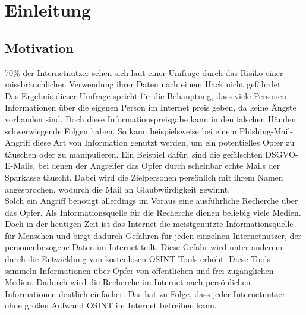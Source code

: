\chapter{Einleitung}
\label{cha:einleitung}

\section{Motivation}
70\% der Internetnutzer sehen sich laut einer Umfrage durch das Risiko einer missbräuchlichen Verwendung ihrer Daten nach einem Hack nicht gefährdet \cite{AngstDatendiebstahl}\\
Das Ergebnis dieser Umfrage spricht für die Behauptung, dass viele Personen Informationen über die eigenen Person im Internet preis geben, da keine Ängste vorhanden sind. Doch diese Informationspreisgabe kann in den falschen Händen schwerwiegende Folgen haben. So kann beispielsweise bei einem Phishing-Mail-Angriff diese Art von Information genutzt werden, um ein potentielles Opfer zu täuschen oder zu manipulieren. 
Ein Beispiel dafür, sind die gefälschten DSGVO-E-Mails, bei denen der Angreifer das Opfer durch scheinbar echte Mails der Sparkasse täuscht. Dabei wird die Zielpersonen persönlich mit ihrem Namen angesprochen, wodurch die Mail an Glaubwürdigkeit gewinnt. \cite{VerbraucherzentraleNW}
\\
Solch ein Angriff benötigt allerdings im Voraus eine ausführliche Recherche über das Opfer. Als Informationsquelle für die Recherche dienen beliebig viele Medien. Doch in der heutigen Zeit ist das Internet die meistgenutzte Informationsquelle für Menschen und birgt dadurch Gefahren für jeden einzelnen Internetnutzer, der personenbezogene Daten im Internet teilt. \cite{Inforamtionsquellen} Diese Gefahr wird unter anderem durch die Entwicklung von kostenlosen OSINT-Tools erhöht. Diese Tools sammeln Informationen über Opfer von öffentlichen und frei zugänglichen Medien. Dadurch wird die Recherche im Internet nach persönlichen Informationen deutlich einfacher. Das hat zu Folge, dass jeder Internetnutzer ohne großen Aufwand OSINT im Internet betreiben kann.

